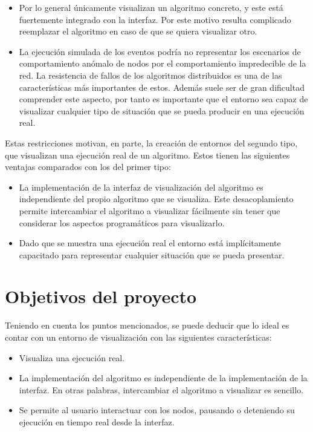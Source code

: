 \begin{itemize}
\item Por lo general únicamente visualizan un algoritmo concreto, y este está fuertemente integrado con la interfaz. Por este motivo resulta complicado reemplazar el algoritmo en caso de que se quiera visualizar otro.
\item La ejecución simulada de los eventos podría no representar los escenarios de comportamiento anómalo de nodos por el comportamiento impredecible de la red. La resistencia de fallos de los algoritmos distribuidos es una de las características más importantes de estos. Además suele ser de gran dificultad comprender este aspecto, por tanto es importante que el entorno sea capaz de visualizar cualquier tipo de situación que se pueda producir en una ejecución real.
\end{itemize}

Estas restricciones motivan, en parte, la creación de entornos del segundo tipo, que visualizan una ejecución real de un algoritmo. Estos tienen las siguientes ventajas comparados con los del primer tipo:

\begin{itemize}
\item La implementación de la interfaz de visualización del algoritmo es independiente del propio algoritmo que se visualiza. Este desacoplamiento permite intercambiar el algoritmo a visualizar fácilmente sin tener que considerar los aspectos programáticos para visualizarlo.
\item Dado que se muestra una ejecución real el entorno está implícitamente capacitado para representar cualquier situación que se pueda presentar.
\end{itemize}

\section{Objetivos del proyecto}

Teniendo en cuenta los puntos mencionados, se puede deducir que lo ideal es contar con un entorno de visualización con las siguientes características:

\begin{itemize}
\item Visualiza una ejecución real.
\item La implementación del algoritmo es independiente de la implementación de la interfaz. En otras palabras, intercambiar el algoritmo a visualizar es sencillo.
\item Se permite al usuario interactuar con los nodos, pausando o deteniendo su ejecución en tiempo real desde la interfaz.
\end{itemize}


